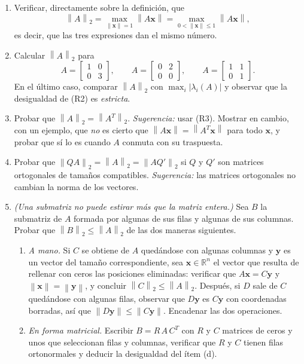 \documentclass[11pt,a4paper]{article}
\newcommand{\R}{\mathbb{R}}
\newcommand{\bi}[1]{\boldsymbol{#1}}
\newcommand{\norm}[1]{\left\|#1\right\|}
\newcommand{\normdos}[1]{\left\|#1\right\|_{2}}
\begin{document}
\begin{enumerate}[label=\textbf{(\alph*)},itemsep=4pt,topsep=4pt]
\item Verificar, directamente sobre la definición, que
\[
\normdos{A}=\max_{\norm{\bi x}=1}\norm{A\bi x}
=\max_{0<\norm{\bi x}\le1}\norm{A\bi x} ,
\]
es decir, que las tres expresiones dan el mismo número.

\item Calcular $\normdos{A}$ para
\[
A=\begin{bmatrix}1&0\\ 0&3\end{bmatrix},
\qquad
A=\begin{bmatrix}0&2\\ 0&0\end{bmatrix},
\qquad
A=\begin{bmatrix}1&1\\ 0&1\end{bmatrix} .
\]
En el último caso, comparar $\normdos{A}$ con $\max_i|\lambda_i(A)|$ y
observar que la desigualdad de (R2) es \emph{estricta}.

\item Probar que $\normdos{A}=\normdos{A^T}$. \emph{Sugerencia:} usar (R3).
Mostrar en cambio, con un ejemplo, que \emph{no} es cierto que
$\norm{A\bi x}=\norm{A^T\bi x}$ para todo $\bi x$, y probar que sí lo es
cuando $A$ conmuta con su traspuesta.

\item Probar que $\normdos{QA}=\normdos{A}=\normdos{AQ'}$ si $Q$ y $Q'$ son
matrices ortogonales de tamaños compatibles. \emph{Sugerencia:} las matrices
ortogonales no cambian la norma de los vectores.

\item \emph{(Una submatriz no puede estirar más que la matriz entera.)} Sea
$B$ la submatriz de $A$ formada por algunas de sus filas y algunas de sus
columnas. Probar que $\normdos{B}\le\normdos{A}$ de las dos maneras
siguientes.
\begin{enumerate}[label=(\roman*),itemsep=2pt,topsep=2pt]
\item \emph{A mano.} Si $C$ se obtiene de $A$ quedándose con algunas
columnas y $\bi y$ es un vector del tamaño correspondiente, sea
$\bi x\in\R^n$ el vector que resulta de rellenar con ceros las posiciones
eliminadas: verificar que $A\bi x=C\bi y$ y $\norm{\bi x}=\norm{\bi y}$, y
concluir $\normdos{C}\le\normdos{A}$. Después, si $D$ sale de $C$ quedándose
con algunas filas, observar que $D\bi y$ es $C\bi y$ con coordenadas
borradas, así que $\norm{D\bi y}\le\norm{C\bi y}$. Encadenar las dos
operaciones.
\item \emph{En forma matricial.} Escribir $B=R\,A\,C^T$ con $R$ y $C$
matrices de ceros y unos que seleccionan filas y columnas, verificar que $R$
y $C$ tienen filas ortonormales y deducir la desigualdad del ítem (d).
\end{enumerate}


\end{enumerate}
\end{document}
